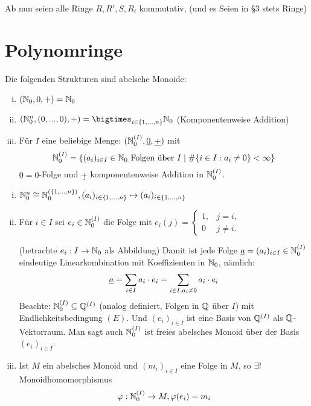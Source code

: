 \documentclass[a4paper]{report}
\begin{document}
\begin{kon*}
Ab nun seien alle Ringe $R, R', S, R_{i}$ kommutativ, (und es Seien in §3 stets Ringe)
\end{kon*}

\section{Polynomringe}
\begin{bsp}
  Die folgenden Strukturen sind abelsche Monoide:
  \begin{enumerate}[(i)]
    \item $(\mathbb{N}_0, 0, +) = \mathbb{N}_0$
    \item $(\Nn^{n}, (0,...,0), +) = \bigtimes_{i \in \eb n} \Nn$ (Komponentenweise Addition)
    \item Für $I$ eine beliebige Menge:
          \((\mathbb{N}_0^{(I)}, \underline 0, \underline +)\) mit
          \[\mathbb{N}_0^{(I)}= \{(a_{i})_{i \in I} \in \mathbb{N}_0 \text{ Folgen über }I \mid \#\{i \in I : a_{i} \ne 0\} < \infty\}\]
          $\underline 0 = 0$-Folge und $\underline +$ komponentenweise Addition in $\mathbb{N}_0^{(I)}$.
  \end{enumerate}
\end{bsp}
\begin{facts}[Übung]\item
\begin{enumerate}[(i)]
  \item $\mathbb{N}_0^{n} \cong \mathbb{N}_0^{(\{1, \ldots, n\})}, (a_{i})_{i \in \{1, \ldots, n\}} \mapsto (a_{i})_{i \in \{1, \ldots, n\}}$
  \item Für $i \in I$ sei $e_{i} \in \mathbb{N}_0^{(I)}$ die Folge mit $e_{i}(j) =
        \begin{cases}
          1, & j = i, \\ 0 & j \ne i.
        \end{cases}$

        (betrachte $e_{i} : I \to \mathbb{N}_0$ als Abbildung) Damit ist jede Folge $\underline a = (a_{i})_{i \in I} \in \mathbb{N}_0^{(I)}$ eindeutige Linearkombination mit Koeffizienten in $\mathbb{N}_0$, nämlich:
        \[\underline a = \sum_{i \in I}a_{i} \cdot e_{i} = \sum_{i \in I, a_{i} \ne 0}a_{i} \cdot e_{i}\]
        Beachte: $\mathbb{N}_0^{(I)} \subseteq \mathbb{Q}^{(I)}$ (analog definiert, Folgen in $\mathbb{Q}$ über $I$) mit Endlichkeitsbedingung $(E)$. Und $(e_{i})_{i \in I}$ ist eine Basis von $\mathbb{Q}^{(I)}$ als $\mathbb{Q}$-Vektorraum. Man sagt auch $\mathbb{N}_0^{(I)}$ ist freies abelsches Monoid über der Basis $(e_{i})_{i \in I}$.
    \item Ist $M$ ein abelsches Monoid und $(m_{i})_{i \in I}$ eine Folge in $M$, so $\exists!$ Monoidhomomorphismus \[\varphi: \mathbb{N}_0^{(I)} \to M, \varphi(e_{i}) = m_{i}\]
\end{enumerate}
\end{facts}
\end{document}
